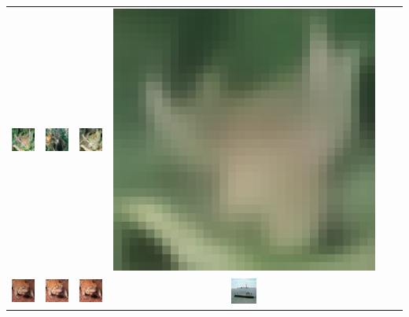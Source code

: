 \begin{table}[h!]
{\begin{tabular}{cccccc}
        \includegraphics[width=.145\textwidth]{chapter4/figures/images/cifar10/corrected_reconstruction/5.png} &
        \includegraphics[width=.145\textwidth]{chapter4/figures/images/cifar10/diffusion_decoder_beta_0.01/5.png} &
        \includegraphics[width=.145\textwidth]{chapter4/figures/images/cifar10/diffusion_decoder_beta_0/5.png} &
        \includegraphics[width=.145\textwidth]{chapter4/figures/images/cifar10/VAE_reconstruction/5.png} \\
        \includegraphics[width=.145\textwidth]{chapter4/figures/images/cifar10/original/6.png} &   
        \includegraphics[width=.145\textwidth]{chapter4/figures/images/cifar10/reconstruction/6.png} &
        \includegraphics[width=.145\textwidth]{chapter4/figures/images/cifar10/corrected_reconstruction/6.png} &
        \includegraphics[width=.145\textwidth]{chapter4/figures/images/cifar10/diffusion_decoder_beta_0.01/6.png} &

\end{tabular}}
\end{table}
